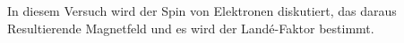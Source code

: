 In diesem Versuch wird der Spin von Elektronen diskutiert, das daraus Resultierende Magnetfeld und es wird der Landé-Faktor bestimmt.